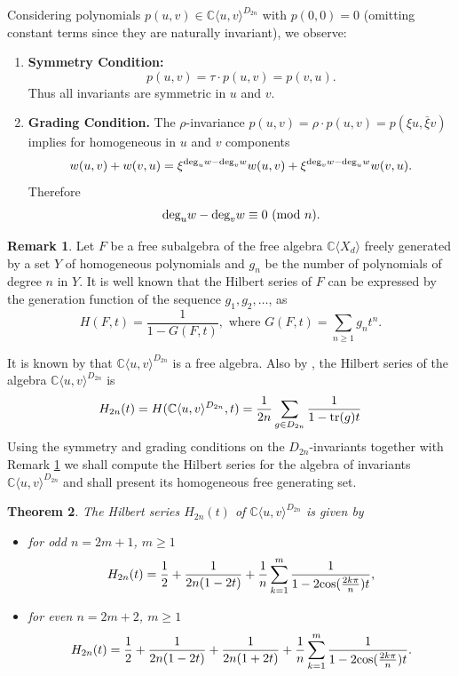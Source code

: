 \documentclass{amsart}[12pt]
\newtheorem{theorem}{Theorem}%
\theoremstyle{definition}
\newtheorem{remark}[theorem]{Remark}
\newcommand{\CuvD}{{\mathbb C}\langle u,v\rangle^{D_{2n}}}
\newcommand{\Dn}{D_{2n}}
\begin{document}
Considering polynomials $p(u,v) \in \mathbb{C}\langle u,v \rangle^{D_{2n}}$ with $p(0,0) = 0$ (omitting constant terms since they are naturally invariant), we observe:
 \begin{enumerate}
 	\item \textbf{Symmetry Condition:}
 \[
 p(u,v)=\tau\cdot p(u,v)=p(v,u).
 \]
 Thus all invariants are symmetric in $u$ and $v$.
\item \textbf{Grading Condition.}
The $\rho$-invariance $p(u,v) =\rho\cdot p(u,v)= p(\xi u, \bar{\xi} v)$ implies for homogeneous in $u$ and $v$ components
\[
w(u,v)+w(v,u)=\xi^{\text{\rm deg}_uw-\text{\rm deg}_vw}w(u,v)+\xi^{\text{\rm deg}_vw-\text{\rm deg}_uw}w(v,u).
\]
Therefore
 \[
 \text{\rm deg}_uw-\text{\rm deg}_vw\equiv0 \ (\text{\rm mod} \ n).
 \]
 \end{enumerate}

\begin{remark}\label{H(F,t) and g(t)}
Let $F$ be a free subalgebra of the free algebra ${\mathbb C}\langle X_d\rangle$ freely generated by a set $Y$ of homogeneous polynomials and $g_n$ be the number of polynomials of degree $n$ in $Y$.
It is well known that the Hilbert series of $F$ can be expressed by the generation function of the sequence $g_1,g_2,\ldots$, as
\[
H(F,t)=\frac{1}{1-G(F,t)},\text{ where }G(F,t)=\sum_{n\geq 1}g_nt^n.
\]
\end{remark}

It is known by \cite{La,Kh1} that $\CuvD$ is a free algebra. Also by \cite{DiFo}, the Hilbert series of the algebra $\CuvD$ is
\[
H_{2n}(t) = H(\CuvD,t)=\frac{1}{2n}\sum_{g\in \Dn}\frac{1}{1-\text{\rm tr}(g)t}
\]
Using the symmetry and grading conditions on the $D_{2n}$-invariants together with Remark \ref{H(F,t) and g(t)}
we shall compute the Hilbert series for the algebra of invariants $\mathbb{C}\langle u,v \rangle^{D_{2n}}$ and  shall present its homogeneous free generating set.

\begin{theorem}
	The Hilbert series $H_{2n}(t)$ of $\mathbb{C}\langle u,v \rangle^{D_{2n}}$ is given by
	\begin{itemize}
		\item [(i)]for odd  $n=2m+1$, $m\geq1$
		\[
		H_{2n}(t)=\frac{1}{2}+\frac{1}{2n(1-2t)}+\frac{1}{n}\sum_{k=1}^{m}\frac{1}{1-2\text{\rm cos}(\frac{2k\pi}{n})t},
		\]
		
		\item [(ii)] for even $n=2m+2$, $m\geq1$
		\[
		H_{2n}(t)=\frac{1}{2}+\frac{1}{2n(1-2t)}+\frac{1}{2n(1+2t)}+\frac{1}{n}\sum_{k=1}^{m}\frac{1}{1-2\text{\rm cos}(\frac{2k\pi}{n})t}.
		\]
	\end{itemize}
\end{theorem}
\end{document}
